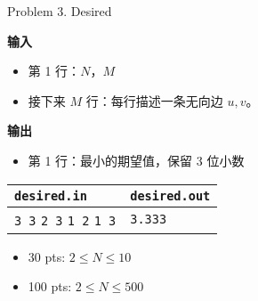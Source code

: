 \documentclass[UTF8]{beamer}
\begin{document}
\begin{frame}{Problem 3. Desired}

\textbf{输入}
\begin{itemize}
    \item 第 1 行：$N$，$M$
    \item 接下来 $M$ 行：每行描述一条无向边 $u, v$。
\end{itemize}
\textbf{输出}
\begin{itemize}
    \item 第 1 行：最小的期望值，保留 3 位小数
\end{itemize}

\begin{tabularx}{\textwidth}{|X|X|}
\hline
\texttt{\textbf{desired.in}} & \texttt{\textbf{desired.out}} \\ \hline
\texttt{3 3}\newline
\texttt{2 3}\newline
\texttt{1 2}\newline
\texttt{1 3}
&
\texttt{3.333}
\\ \hline
\end{tabularx}
\newline
\begin{itemize}
    \item 30 pts: $2 \leq N \leq 10$
    \item 100 pts: $2 \leq N \leq 500$
\end{itemize}

\end{frame}
\end{document}
